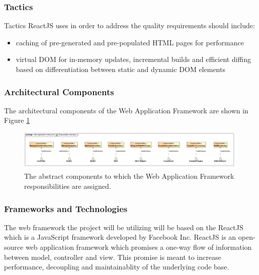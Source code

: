 \subsubsection{Tactics}
Tactics ReactJS uses in order to address the quality requirements should include:
\begin{itemize}
	\item caching of pre-generated and pre-populated HTML pages for performance
	\item virtual DOM for in-memory updates, incremental builds and efficient 
	diffing based on differentiation between static and dynamic DOM elements
\end{itemize}

\subsubsection{Architectural Components}
The architectural components of the  Web Application Framework are shown in Figure \ref{fig:webApplicationFrameworkResponsibilityAllocation}
\begin{figure}[H]
	\begin{center}
	\includegraphics[scale=0.35]{../Diagrams and Charts/Web Application Framework/ResponsibilityAllocation.jpg}
	\caption{The abstract components to which the Web Application Framework responsibilities are assigned.}
	\label{fig:webApplicationFrameworkResponsibilityAllocation}
	\end{center}
\end{figure}

\subsubsection{Frameworks and Technologies}
The web framework the project will be utilizing will be based on the ReactJS
which is a JavaScript framework developed by Facebook Inc. ReactJS is an open-source web
application framework which promises a one-way flow of information between 
model, controller and view. This promise is meant to increase performance,
decoupling and maintainablity of the underlying code base.

